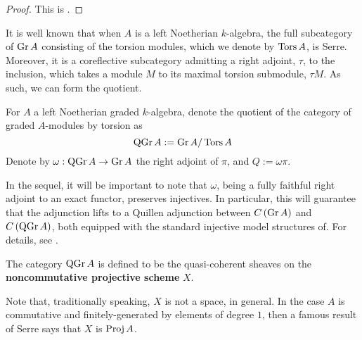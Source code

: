 \begin{proof}
  This is \parencite[Cor. 1, III.3]{DCA62}.
\end{proof}

It is well known that when \(A\) is a left Noetherian \(k\)-algebra, the full subcategory of \(\operatorname{Gr}A\) consisting of the torsion modules, which we denote by \(\operatorname{Tors}A\), is Serre.
Moreover, it is a coreflective subcategory admitting a right adjoint, \(\tau\), to the inclusion, which takes a module \(M\) to its maximal torsion submodule, \(\tau{M}\).
As such, we can form the quotient.
\begin{definition}
  For \(A\) a left Noetherian graded \(k\)-algebra, denote the quotient of the category of graded \(A\)-modules by torsion as
  \begin{displaymath}
    \operatorname{QGr}A := \operatorname{Gr}A / \operatorname{Tors}A
  \end{displaymath}
  Denote by \(\omega : \operatorname{QGr}A \to \operatorname{Gr}A\) the right adjoint of \(\pi\), and \(Q := \omega\pi\).
\end{definition}

\begin{remark}
  In the sequel, it will be important to note that \(\omega\), being a fully faithful right adjoint to an exact functor, preserves injectives.
  In particular, this will guarantee that the adjunction lifts to a Quillen adjunction between \(C\left(\operatorname{Gr}A\right)\) and \(C\left(\operatorname{QGr}A\right)\), both equipped with the standard injective model structures of.  For details, see \parencite{Hovey01}.
\end{remark}

The category \(\operatorname{QGr}A\) is defined to be the quasi-coherent sheaves on the \textbf{noncommutative projective scheme} \(X\). 

\begin{remark}
  Note that, traditionally speaking, \(X\) is not a space, in general. In the case \(A\) is commutative and finitely-generated by elements of degree \(1\), then a famous result of Serre says that \(X\) is \(\operatorname{Proj} A\).
\end{remark}

